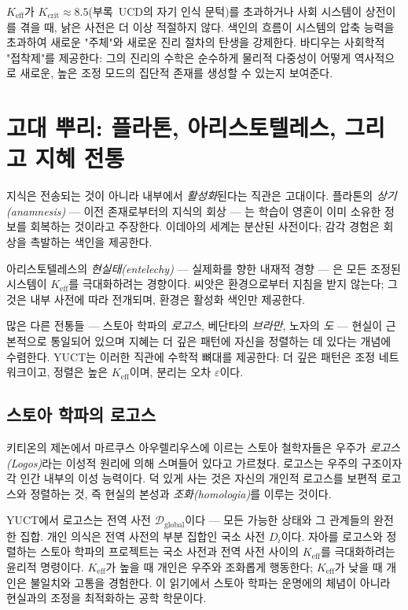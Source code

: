 \documentclass[12pt,a4paper]{article}
\newcommand{\Keff}{K_{\mathrm{eff}}}
\begin{document}
	\(\Keff\)가 \(K_{\mathrm{crit}} \approx 8.5\)(부록~UCD의 자기 인식 문턱)를 초과하거나 사회 시스템이 상전이를 겪을 때, 낡은 사전은 더 이상 적절하지 않다. 색인의 흐름이 시스템의 압축 능력을 초과하여 새로운 "주체"와 새로운 진리 절차의 탄생을 강제한다. 바디우는 사회학적 "접착제"를 제공한다: 그의 진리의 수학은 순수하게 물리적 다중성이 어떻게 역사적으로 새로운, 높은 조정 모드의 집단적 존재를 생성할 수 있는지 보여준다.
	
	\section{고대 뿌리: 플라톤, 아리스토텔레스, 그리고 지혜 전통}
	
	지식은 전송되는 것이 아니라 내부에서 \emph{활성화}된다는 직관은 고대이다. 플라톤의 \emph{상기(anamnesis)} — 이전 존재로부터의 지식의 회상 — 는 학습이 영혼이 이미 소유한 정보를 회복하는 것이라고 주장한다. 이데아의 세계는 분산된 사전이다; 감각 경험은 회상을 촉발하는 색인을 제공한다.
	
	아리스토텔레스의 \emph{현실태(entelechy)} — 실제화를 향한 내재적 경향 — 은 모든 조정된 시스템이 \(K_{\mathrm{eff}}\)를 극대화하려는 경향이다. 씨앗은 환경으로부터 지침을 받지 않는다; 그것은 내부 사전에 따라 전개되며, 환경은 활성화 색인만 제공한다.
	
	많은 다른 전통들 — 스토아 학파의 \emph{로고스}, 베단타의 \emph{브라만}, 노자의 \emph{도} — 현실이 근본적으로 통일되어 있으며 지혜는 더 깊은 패턴에 자신을 정렬하는 데 있다는 개념에 수렴한다. YUCT는 이러한 직관에 수학적 뼈대를 제공한다: 더 깊은 패턴은 조정 네트워크이고, 정렬은 높은 \(K_{\mathrm{eff}}\)이며, 분리는 오차 \(\varepsilon\)이다.
	
	\subsection{스토아 학파의 로고스}
	
	키티온의 제논에서 마르쿠스 아우렐리우스에 이르는 스토아 철학자들은 우주가 \emph{로고스(Logos)}라는 이성적 원리에 의해 스며들어 있다고 가르쳤다. 로고스는 우주의 구조이자 각 인간 내부의 이성 능력이다. 덕 있게 사는 것은 자신의 개인적 로고스를 보편적 로고스와 정렬하는 것, 즉 현실의 본성과 \emph{조화(homologia)}를 이루는 것이다.
	
	YUCT에서 로고스는 전역 사전 \(\mathcal{D}_{\text{global}}\)이다 — 모든 가능한 상태와 그 관계들의 완전한 집합. 개인 의식은 전역 사전의 부분 집합인 국소 사전 \(D_i\)이다. 자아를 로고스와 정렬하는 스토아 학파의 프로젝트는 국소 사전과 전역 사전 사이의 \(K_{\mathrm{eff}}\)를 극대화하려는 윤리적 명령이다. \(K_{\mathrm{eff}}\)가 높을 때 개인은 우주와 조화롭게 행동한다; \(K_{\mathrm{eff}}\)가 낮을 때 개인은 불일치와 고통을 경험한다. 이 읽기에서 스토아 학파는 운명에의 체념이 아니라 현실과의 조정을 최적화하는 공학 학문이다.
	
\end{document}
